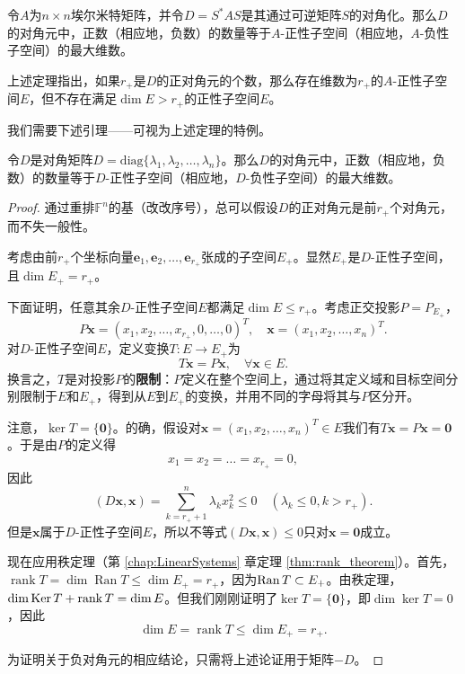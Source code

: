 \begin{theorem}\label{thm:diag_positive_a_positive_dim}
    令$A$为$n\times n$埃尔米特矩阵，并令$D=S^*AS$是其通过可逆矩阵$S$的对角化。那么$D$的对角元中，正数（相应地，负数）的数量等于$A$-正性子空间（相应地，$A$-负性子空间）的最大维数。
\end{theorem}

上述定理指出，如果$r_+$是$D$的正对角元的个数，那么存在维数为$r_+$的$A$-正性子空间$E$，但不存在满足$\dim E>r_+$的正性子空间$E$。

我们需要下述引理——可视为上述定理的特例。

\begin{lemma}
    令$D$是对角矩阵$D=\mathrm{diag}\{\lambda_{1},\lambda_{2},\ldots,\lambda_{n}\}$。那么$D$的对角元中，正数（相应地，负数）的数量等于$D$-正性子空间（相应地，$D$-负性子空间）的最大维数。
\end{lemma}

\begin{proof}
    通过重排$\mathbb{F}^n$的基（改改序号），总可以假设$D$的正对角元是前$r_+$个对角元，而不失一般性。

    考虑由前$r_+$个坐标向量$\mathbf{e}_1,\mathbf{e}_2,\ldots,\mathbf{e}_{r_+}$张成的子空间$E_+$。显然$E_+$是$D$-正性子空间，且$\dim E_+=r_+$。

    下面证明，任意其余$D$-正性子空间$E$都满足$\dim E\le r_+$。考虑正交投影$P=P_{E_+}$，
    \[P\mathbf{x}=(x_1,x_2,\ldots,x_{r_+},0,\ldots,0)^T,\quad\mathbf{x}=(x_1,x_2,\ldots,x_n)^T.\]
    对$D$-正性子空间$E$，定义变换$T:E\to E_+$为
    \[T\mathbf{x}=P\mathbf{x},\quad \forall \mathbf{x}\in E.\]
    换言之，$T$是对投影$P$的{\bf 限制}：$P$定义在整个空间上，通过将其定义域和目标空间分别限制于$E$和$E_+$，得到从$E$到$E_+$的变换，并用不同的字母将其与$P$区分开。

    注意，$\ker T=\{\mathbf{0}\}$。的确，假设对$\mathbf{x}=(x_{1},x_{2},\ldots,x_{n})^{T}\in E$我们有$T\mathbf{x}=P\mathbf{x}=\mathbf{0}$。于是由$P$的定义得\[x_1=x_2=\ldots=x_{r_+}=0,\]
    因此\[(D\mathbf{x},\mathbf{x})=\sum_{k=r_++1}^n\lambda_kx_k^2\leq0\quad(\lambda_k\leq0, k>r_+).\]
    但是$\mathbf{x}$属于$D$-正性子空间$E$，所以不等式$(D\mathbf{x},\mathbf{x})\le 0$只对$\mathbf{x}=\mathbf{0}$成立。

    现在应用秩定理（第 \ref{chap:LinearSystems} 章定理 \ref{thm:rank_theorem}）。首先，$\operatorname{rank}T=\dim\operatorname{Ran}T\leq\dim E_+=r_+$，因为$\operatorname{Ran} T\subset E_+$。由秩定理，$\dim\operatorname{Ker} T+\operatorname{rank} T=\dim E$。但我们刚刚证明了$\ker T=\{\mathbf{0}\}$，即$\dim\ker T=0$，因此
    \[\dim E=\operatorname{rank}T\leq\dim E_{+}=r_{+}.\]

    为证明关于负对角元的相应结论，只需将上述论证用于矩阵$-D$。
\end{proof}

